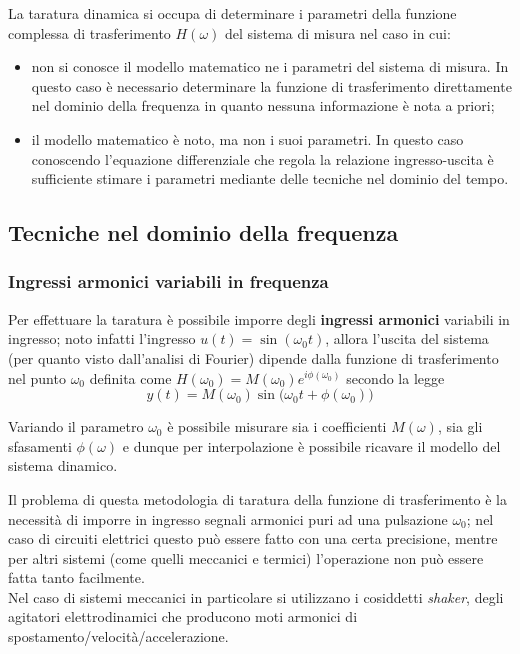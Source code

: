 		La taratura dinamica si occupa di determinare i parametri della funzione complessa di trasferimento $H(\omega)$ del sistema di misura nel caso in cui:
		\begin{itemize}
			\item non si conosce il modello matematico ne i parametri del sistema di misura. In questo caso è necessario determinare la funzione di trasferimento direttamente nel dominio della frequenza in quanto nessuna informazione è nota a priori;
			\item il modello matematico è noto, ma non i suoi parametri. In questo caso conoscendo l'equazione differenziale che regola la relazione ingresso-uscita è sufficiente stimare i parametri mediante delle tecniche nel dominio del tempo.
		\end{itemize}
		
	\subsection{Tecniche nel dominio della frequenza}
		\subsubsection{Ingressi armonici variabili in frequenza}
		Per effettuare la taratura è possibile imporre degli \textbf{ingressi armonici} variabili in ingresso; noto infatti l'ingresso $u(t) = \sin(\omega_0 t)$, allora l'uscita del sistema (per quanto visto dall'analisi di Fourier) dipende dalla funzione di trasferimento nel punto $\omega_0$ definita come $H(\omega_0) = M(\omega_0) e^{i\phi(\omega_0)}$ secondo la legge
		\[ y(t) = M(\omega_0 ) \sin \big(\omega_0 t+ \phi(\omega_0) \big)\]
		
		Variando il parametro $\omega_0$ è possibile misurare sia i coefficienti $M(\omega)$, sia gli sfasamenti $\phi(\omega)$ e dunque per interpolazione è possibile ricavare il modello del sistema dinamico.
		
		Il problema di questa metodologia di taratura della funzione di trasferimento è la necessità di imporre in ingresso segnali armonici puri ad una pulsazione $\omega_0$; nel caso di circuiti elettrici questo può essere fatto con una certa precisione, mentre per altri sistemi (come quelli meccanici e termici) l'operazione non può essere fatta tanto facilmente.\\
		Nel caso di sistemi meccanici in particolare si utilizzano i cosiddetti \textit{shaker}, degli agitatori  elettrodinamici che producono moti armonici di spostamento/velocità/accelerazione.
			

